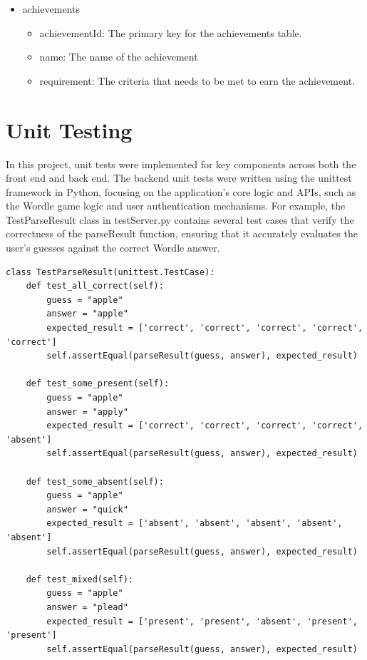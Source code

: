 \begin{itemize}
    \begin{itemize}
    \item id: The primary key for the user achievements table.
    \item userId: The foreign key that links achievements to a specific user.
    \item achievementId: A foreign key that links to a specific achievement on the achievement table.
    \item dateAchieved: The date when the achievement was earned by the user.
    \end{itemize}
\item achievements
    \begin{itemize}
    \item achievementId: The primary key for the achievements table.
    \item name: The name of the achievement
    \item requirement: The criteria that needs to be met to earn the achievement.
    \end{itemize}
\end{itemize}

\section{Unit Testing}
In this project, unit tests were implemented for key components across both the front end and back end. The backend unit tests were written using the unittest framework in Python, focusing on the application's core logic and APIs, such as the Wordle game logic and user authentication mechanisms. For example, the TestParseResult class in testServer.py contains several test cases that verify the correctness of the parseResult function, ensuring that it accurately evaluates the user's guesses against the correct Wordle answer.

\begin{lstlisting}[style=python, caption={The parseResult functions unit tests}]
class TestParseResult(unittest.TestCase):
    def test_all_correct(self):
        guess = "apple"
        answer = "apple"
        expected_result = ['correct', 'correct', 'correct', 'correct', 'correct']
        self.assertEqual(parseResult(guess, answer), expected_result)

    def test_some_present(self):
        guess = "apple"
        answer = "apply"
        expected_result = ['correct', 'correct', 'correct', 'correct', 'absent']
        self.assertEqual(parseResult(guess, answer), expected_result)

    def test_some_absent(self):
        guess = "apple"
        answer = "quick"
        expected_result = ['absent', 'absent', 'absent', 'absent', 'absent']
        self.assertEqual(parseResult(guess, answer), expected_result)

    def test_mixed(self):
        guess = "apple"
        answer = "plead"
        expected_result = ['present', 'present', 'absent', 'present', 'present']
        self.assertEqual(parseResult(guess, answer), expected_result)
\end{lstlisting}

